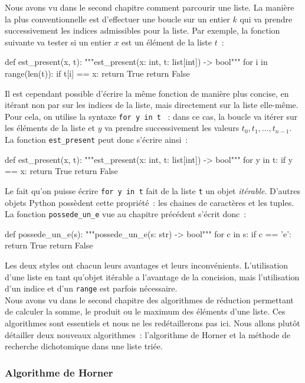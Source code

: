 \documentclass{magnolia}
\begin{document}
Nous avons vu dans le second chapitre comment parcourir une liste. La manière la plus conventionnelle
est d'effectuer une boucle sur un entier $k$ qui va prendre successivement les indices admissibles
pour la liste. Par exemple, la fonction suivante va tester si un entier $x$ est un élément de la
liste $t$~:
\begin{pythoncode}
def est_present(x, t):
    """est_present(x: int, t: list[int]) -> bool"""
    for i in range(len(t)):
        if t[i] == x:
            return True
    return False
\end{pythoncode}
Il est cependant possible d'écrire la même fonction de manière plus concise, en itérant
non par sur les indices de la liste, mais directement sur la liste elle-même. Pour cela, on
utilise la syntaxe \og \verb!for y in t! \fg~: dans ce cas, la boucle va itérer sur les éléments
de la liste et $y$ va prendre successivement les valeurs $t_0, t_1,\ldots,t_{n-1}$. La fonction \verb!est_present! peut donc s'écrire ainsi~:
\begin{pythoncode}
def est_present(x, t):
    """est_present(x: int, t: list[int]) -> bool"""
    for y in t:
        if y == x:
            return True
    return False
\end{pythoncode}
Le fait qu'on puisse écrire \og \verb!for y in t! \fg fait de la liste \verb!t! un objet \emph{itérable}.
D'autres objets Python possèdent cette propriété~: les chaines de caractères et les tuples. La fonction
\verb!possede_un_e! vue au chapitre précédent s'écrit donc~:
\begin{pythoncode}
def possede_un_e(s):
    """possede_un_e(s: str) -> bool"""
    for c in s:
        if c == 'e':
            return True
    return False
\end{pythoncode}
Les deux styles ont chacun leurs avantages et leurs inconvénients. L'utilisation d'une liste en tant
qu'objet itérable a l'avantage de la concision, mais l'utilisation d'un indice et d'un \verb!range! est parfois nécessaire.\\

Nous avons vu dans le second chapitre des algorithmes de réduction permettant de
calculer la somme, le produit ou le maximum des éléments d'une liste. Ces algorithmes sont essentiels
et nous ne les redétaillerons pas ici. Nous allons plutôt détailler deux nouveaux algorithmes~:
l'algorithme de Horner et la méthode de recherche dichotomique dans une liste triée.

\subsubsection{Algorithme de Horner}
\end{document}
